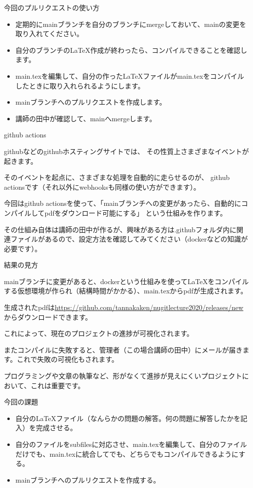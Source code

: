 \documentclass[12pt, unicode]{beamer}
\begin{document}
\begin{frame}{今回のプルリクエストの使い方}

\begin{itemize}
\item 定期的にmainブランチを自分のブランチにmergeしておいて、mainの変更を取り入れてください。
\item 自分のブランチのLaTeX作成が終わったら、コンパイルできることを確認します。
\item main.texを編集して、自分の作ったLaTeXファイルがmain.texをコンパイルしたときに取り入れられるようにします。
\item mainブランチへのプルリクエストを作成します。
\item 講師の田中が確認して、mainへmergeします。
\end{itemize}

\end{frame}
\begin{frame}{github actions}

githubなどのgithubホスティングサイトでは、
その性質上さまざまなイベントが起きます。

そのイベントを起点に、さまざまな処理を自動的に走らせるのが、
github actionsです（それ以外にwebhooksも同様の使い方ができます）。

今回はgithub actionsを使って、「mainブランチへの変更があったら、自動的にコンパイルしてpdfをダウンロード可能にする」
という仕組みを作ります。


その仕組み自体は講師の田中が作るが、興味がある方は.githubフォルダ内に関連ファイルがあるので、設定方法を確認してみてください（dockerなどの知識が必要です）。

\end{frame}
\begin{frame}{結果の見方}

mainブランチに変更があると、dockerという仕組みを使って\LaTeX をコンパイルする仮想環境が作られ（結構時間がかかる）、main.texからpdfが生成されます。

生成されたpdfは\url{https://github.com/tannakaken/nugitlecture2020/releases/new}からダウンロードできます。

これによって、現在のプロジェクトの進捗が可視化されます。

またコンパイルに失敗すると、管理者（この場合講師の田中）にメールが届きます。これで失敗の可視化もされます。

プログラミングや文章の執筆など、形がなくて進捗が見えにくいプロジェクトにおいて、これは重要です。
\end{frame}

\begin{frame}{今回の課題}

\begin{itemize}
\item 自分の\LaTeX ファイル（なんらかの問題の解答。何の問題に解答したかを記入）を完成させる。
\item 自分のファイルをsubfilesに対応させ、main.texを編集して、自分のファイルだけでも、main.texに統合してでも、どちらでもコンパイルできるようにする。
\item mainブランチへのプルリクエストを作成する。
\end{itemize}
\end{frame}
\end{document}
